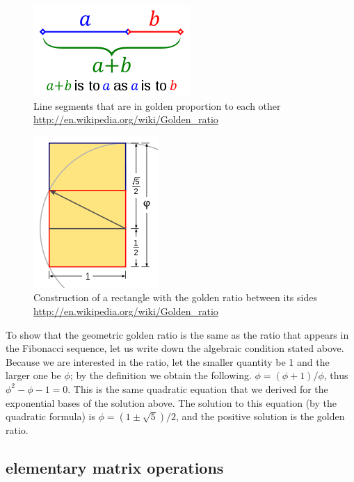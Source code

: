\documentclass[
  letterpaper,
  DIV=11,
  numbers=noendperiod]{scrreprt}
\begin{document}
\begin{figure}

{\centering \includegraphics{./images/golden_ratio_line.png}

}

\caption{Line segments that are in golden proportion to each other
\url{http://en.wikipedia.org/wiki/Golden_ratio}}

\end{figure}

\begin{figure}

{\centering \includegraphics{./images/gold_rect_const.png}

}

\caption{Construction of a rectangle with the golden ratio between its
sides \url{http://en.wikipedia.org/wiki/Golden_ratio}}

\end{figure}

To show that the geometric golden ratio is the same as the ratio that
appears in the Fibonacci sequence, let us write down the algebraic
condition stated above. Because we are interested in the ratio, let the
smaller quantity be 1 and the larger one be \(\phi\); by the definition
we obtain the following. \(\phi = (\phi+1)/\phi\), thus
\(\phi^2-\phi-1 = 0\). This is the same quadratic equation that we
derived for the exponential bases of the solution above. The solution to
this equation (by the quadratic formula) is \(\phi=(1\pm\sqrt5)/2\), and
the positive solution is the golden ratio.

\hypertarget{elementary-matrix-operations}{%
\subsection{elementary matrix
operations}\label{elementary-matrix-operations}}
\end{document}
